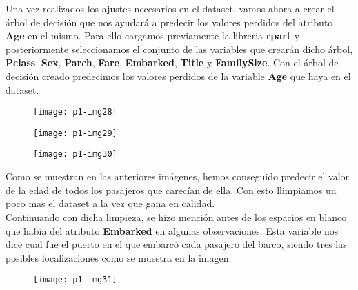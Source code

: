 \documentclass[10pt]{article}
\begin{document}
Una vez realizados los ajustes necesarios en el dataset, vamos ahora a crear el árbol de decisión que nos ayudará a predecir los valores perdidos del atributo \textbf{Age} en el mismo. Para ello cargamos previamente la libreria \textbf{rpart} y posteriormente seleccionamos el conjunto de las variables que crearán dicho árbol, \textbf{Pclass}, \textbf{Sex}, \textbf{Parch}, \textbf{Fare}, \textbf{Embarked}, \textbf{Title} y \textbf{FamilySize}. Con el árbol de decisión creado predecimos los valores perdidos de la variable \textbf{Age} que haya en el dataset. \\

\begin{figure}[H]
	\begin{center}
 		\texttt{[image: p1-img28]}
	\end{center} 
\end{figure} 

\begin{figure}[H]
	\begin{center}
 		\texttt{[image: p1-img29]}
	\end{center} 
\end{figure} 

\begin{figure}[H]
	\begin{center}
 		\texttt{[image: p1-img30]}
	\end{center} 
\end{figure} 


Como se muestran en las anteriores imágenes, hemos conseguido predecir el valor de la edad de todos los pasajeros que carecían de ella. Con esto llimpiamos un poco mas el dataset a la vez que gana en calidad. \\

Continuando con dicha limpieza, se hizo mención antes de los espacios en blanco que había del atributo \textbf{Embarked} en algunas observaciones. Esta variable nos dice cual fue el puerto en el que embarcó cada pasajero del barco, siendo tres las posibles localizaciones como se muestra en la imagen. \\

\begin{figure}[H]
	\begin{center}
 		\texttt{[image: p1-img31]}
	\end{center} 
\end{figure} 
\end{document}
